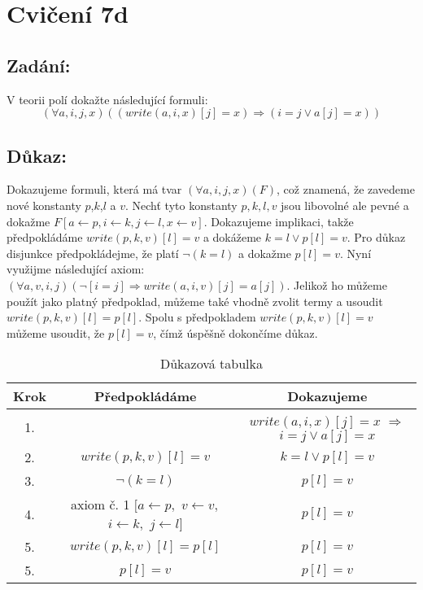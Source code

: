 \documentclass{article}
\begin{document}
\section{Cvičení 7d}

\subsection{Zadání:}

V teorii polí dokažte následující formuli:
$$(\forall a, i, j, x)((write(a, i, x)[j] = x) \Rightarrow (i = j \lor a[j] = x))$$


\subsection{Důkaz:}

Dokazujeme formuli, která má tvar $(\forall a, i, j, x)(F)$, což znamená, že zavedeme nové konstanty $p$,$k$,$l$ a $v$. Nechť tyto konstanty $p,k,l,v$ jsou libovolné ale pevné a dokažme $F[a\leftarrow p,i \leftarrow k, j \leftarrow l, x \leftarrow v]$. Dokazujeme implikaci, takže předpokládáme $write(p, k, v)[l] = v$ a dokážeme $k = l \lor p[l] = v$. Pro důkaz disjunkce předpokládejme, že platí $\neg (k = l)$ a dokažme $p[l] = v$. Nyní využijme následující axiom: $(\forall a, v, i, j ) ( \neg [i = j] \Rightarrow write(a, i, v)[j] = a[j])$. Jelikož ho můžeme použít jako platný předpoklad, můžeme také vhodně zvolit termy a usoudit  $write(p,k,v)[l] = p[l]$. Spolu s předpokladem $write(p, k, v)[l] = v$ můžeme usoudit, že $p[l] = v$, čímž úspěšně dokončíme důkaz.

\begin{table}[H]\centering

    \caption{Důkazová tabulka}

\begin{tabular}{|c|c|c|}
    
    
        \hline \textbf{Krok} & \textbf{Předpokládáme} & \textbf{Dokazujeme} \\ \hline \hline
    	1. & & \makecell{$write(a, i, x)[j] = x$ \\ $\Rightarrow$ \\ $i = j \lor a[j] = x$}  \\ \hline
    	2. & $write(p, k, v)[l] = v$ & $k = l \lor p[l] = v$ \\ \hline
    	3. & $\neg (k = l)$ & $p[l] = v$ \\ \hline
    	4. & \makecell{axiom č. 1 \\ $[a \leftarrow p,$ \\ $ v \leftarrow v,$ \\ $i \leftarrow k,$ \\ $j \leftarrow l]$} & $p[l] = v$ \\ \hline
    	5. & $write(p,k,v)[l] = p[l]$ & $p[l] = v$ \\ \hline
    	5. & $p[l] = v$ & $p[l] = v$ \\ \hline
    	
    	\end{tabular}
\end{table}
\end{document}
